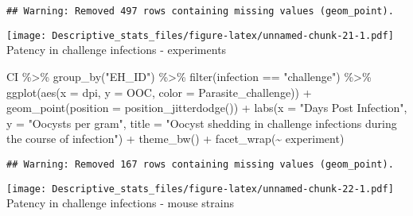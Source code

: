 \documentclass[
]{article}
\newenvironment{Shaded}{\begin{snugshade}}{\end{snugshade}}
\newcommand{\AttributeTok}[1]{\textcolor[rgb]{0.77,0.63,0.00}{#1}}
\newcommand{\FunctionTok}[1]{\textcolor[rgb]{0.00,0.00,0.00}{#1}}
\newcommand{\NormalTok}[1]{#1}
\newcommand{\SpecialCharTok}[1]{\textcolor[rgb]{0.00,0.00,0.00}{#1}}
\newcommand{\StringTok}[1]{\textcolor[rgb]{0.31,0.60,0.02}{#1}}
\begin{document}
\begin{verbatim}
## Warning: Removed 497 rows containing missing values (geom_point).
\end{verbatim}

\texttt{[image: Descriptive\_stats\_files/figure-latex/unnamed-chunk-21-1.pdf]}
Patency in challenge infections - experiments

\begin{Shaded}
\begin{Highlighting}[]
\NormalTok{CI }\SpecialCharTok{\%\textgreater{}\%}
  \FunctionTok{group\_by}\NormalTok{(}\StringTok{"EH\_ID"}\NormalTok{) }\SpecialCharTok{\%\textgreater{}\%}
  \FunctionTok{filter}\NormalTok{(infection }\SpecialCharTok{==} \StringTok{"challenge"}\NormalTok{) }\SpecialCharTok{\%\textgreater{}\%}
  \FunctionTok{ggplot}\NormalTok{(}\FunctionTok{aes}\NormalTok{(}\AttributeTok{x =}\NormalTok{ dpi, }\AttributeTok{y =}\NormalTok{ OOC, }\AttributeTok{color =}\NormalTok{ Parasite\_challenge)) }\SpecialCharTok{+}
  \FunctionTok{geom\_point}\NormalTok{(}\AttributeTok{position =} \FunctionTok{position\_jitterdodge}\NormalTok{()) }\SpecialCharTok{+}
  \FunctionTok{labs}\NormalTok{(}\AttributeTok{x =} \StringTok{"Days Post Infection"}\NormalTok{, }\AttributeTok{y =} \StringTok{"Oocysts per gram"}\NormalTok{,}
       \AttributeTok{title =} \StringTok{"Oocyst shedding in challenge infections during the }
\StringTok{       course of infection"}\NormalTok{) }\SpecialCharTok{+}
    \FunctionTok{theme\_bw}\NormalTok{() }\SpecialCharTok{+}
    \FunctionTok{facet\_wrap}\NormalTok{(}\SpecialCharTok{\textasciitilde{}}\NormalTok{ experiment)}
\end{Highlighting}
\end{Shaded}

\begin{verbatim}
## Warning: Removed 167 rows containing missing values (geom_point).
\end{verbatim}

\texttt{[image: Descriptive\_stats\_files/figure-latex/unnamed-chunk-22-1.pdf]}
Patency in challenge infections - mouse strains
\end{document}
